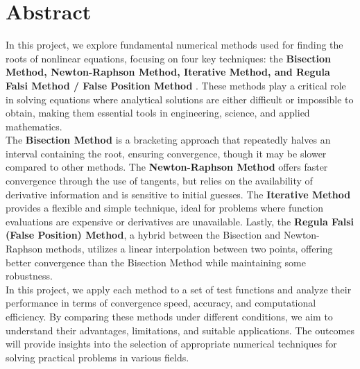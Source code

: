 \documentclass[12pt,a4paper]{article}
\begin{document}
	\newpage
	
	\thispagestyle{empty}
	\section*{Abstract}
	
	
	\begin{normalsize}
		
		
		In this project, we explore fundamental numerical methods used for finding the roots of nonlinear equations, focusing on four key techniques: the \textbf{Bisection Method, Newton-Raphson Method, Iterative Method, and Regula Falsi Method / False Position Method} . These methods play a critical role in solving equations where analytical solutions are either difficult or impossible to obtain, making them essential tools in engineering, science, and applied mathematics.\\
		
		The \textbf{Bisection Method} is a bracketing approach that repeatedly halves an interval containing the root, ensuring convergence, though it may be slower compared to other methods. The \textbf{Newton-Raphson Method} offers faster convergence through the use of tangents, but relies on the availability of derivative information and is sensitive to initial guesses. The \textbf{Iterative Method} provides a flexible and simple technique, ideal for problems where function evaluations are expensive or derivatives are unavailable. Lastly, the \textbf{Regula Falsi (False Position) Method}, a hybrid between the Bisection and Newton-Raphson methods, utilizes a linear interpolation between two points, offering better convergence than the Bisection Method while maintaining some robustness.\\
		
		In this project, we apply each method to a set of test functions and analyze their performance in terms of convergence speed, accuracy, and computational efficiency. By comparing these methods under different conditions, we aim to understand their advantages, limitations, and suitable applications. The outcomes will provide insights into the selection of appropriate numerical techniques for solving practical problems in various fields.
	\end{normalsize}
	
	
	
	
	
	\newpage
	\tableofcontents
	\newpage
	\setcounter{page}{1}
	
\end{document}
